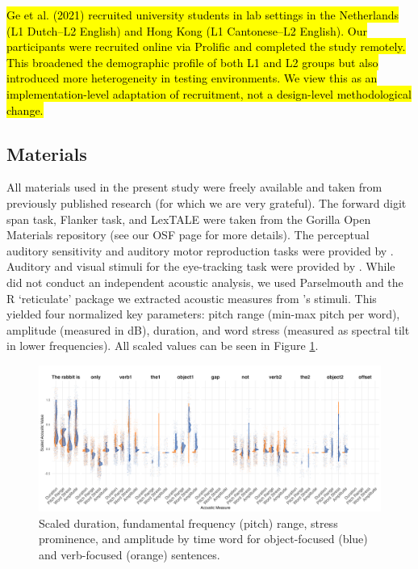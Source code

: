 \hl{Ge et al. (2021) recruited university students in lab settings in the Netherlands (L1 Dutch–L2 English) and Hong Kong (L1 Cantonese–L2 English). Our participants were recruited online via Prolific and completed the study remotely. This broadened the demographic profile of both L1 and L2 groups but also introduced more heterogeneity in testing environments. We view this as an implementation-level adaptation of recruitment, not a design-level methodological change.}

\subsection{Materials}
All materials used in the present study were freely available and taken from previously published research (for which we are very grateful). The forward digit span task, Flanker task, and LexTALE \parencite{lemhofer2012introducing} were taken from the Gorilla \parencite{Anwyl-Irvine_2019} Open Materials repository (see our OSF page for more details). The perceptual auditory sensitivity and auditory motor reproduction tasks were provided by \cite{Kachlicka_Saito_Tierney_2019, saito2020domain}. Auditory and visual stimuli for the eye-tracking task were provided by \cite{ge2021a}. While \cite{ge2021a} did not conduct an independent acoustic analysis, we used  Parselmouth \parencite{jadoul2018introducing} and the R `reticulate' package \parencite{Ushey2022} we extracted acoustic measures from \cite{ge2021a}'s stimuli. This yielded four normalized key parameters: pitch range (min-max pitch per word), amplitude (measured in dB), duration, and word stress (measured as spectral tilt in lower frequencies). All scaled values can be seen in Figure \ref{fig:acoustic_faceted}.

\begin{figure}[H]  %
    \centering
    \includegraphics[width=\textwidth,height=\textheight,keepaspectratio]{viz/acoustic_faceted.png}
    \caption{Scaled duration, fundamental frequency (pitch) range, stress prominence, and amplitude by time word for object-focused (blue) and verb-focused (orange) sentences.}
    \label{fig:acoustic_faceted}
\end{figure}


